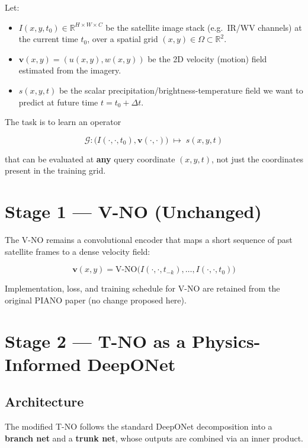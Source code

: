 \documentclass[11pt]{article}
\begin{document}
Let:
\begin{itemize}
    \item $I(x, y, t_0) \in \mathbb{R}^{H \times W \times C}$ be the satellite image stack (e.g.\ IR/WV channels) at the current time $t_0$, over a spatial grid $(x, y) \in \Omega \subset \mathbb{R}^2$.
    \item $\mathbf{v}(x, y) = (u(x,y), w(x,y))$ be the 2D velocity (motion) field estimated from the imagery.
    \item $s(x, y, t)$ be the scalar precipitation/brightness-temperature field we want to predict at future time $t = t_0 + \Delta t$.
\end{itemize}

The task is to learn an operator

\begin{equation}
\mathcal{G}: \big(I(\cdot, \cdot, t_0), \mathbf{v}(\cdot,\cdot)\big) \;\longmapsto\; s(x, y, t)
\end{equation}

that can be evaluated at \textbf{any} query coordinate $(x, y, t)$, not just the coordinates present in the training grid.

\section{Stage 1 --- V-NO (Unchanged)}

The V-NO remains a convolutional encoder that maps a short sequence of past satellite frames to a dense velocity field:

\begin{equation}
\mathbf{v}(x, y) = \text{V-NO}\big(I(\cdot,\cdot,t_{-k}), \dots, I(\cdot,\cdot,t_0)\big)
\end{equation}

Implementation, loss, and training schedule for V-NO are retained from the original PIANO paper (no change proposed here).

\section{Stage 2 --- T-NO as a Physics-Informed DeepONet}

\subsection{Architecture}

The modified T-NO follows the standard DeepONet decomposition into a \textbf{branch net} and a \textbf{trunk net}, whose outputs are combined via an inner product.
\end{document}
